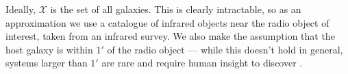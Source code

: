   Ideally, $\mathcal X$ is the set of all galaxies. This is clearly
  intractable, so as an approximation we use a catalogue of infrared objects
  near the radio object of interest, taken from an infrared survey. We also
  make the assumption that the host galaxy is within $1'$ of the radio object
  --- while this doesn't hold in general, systems larger than $1'$ are rare and
  require human insight to discover \citep{banfield16}.








